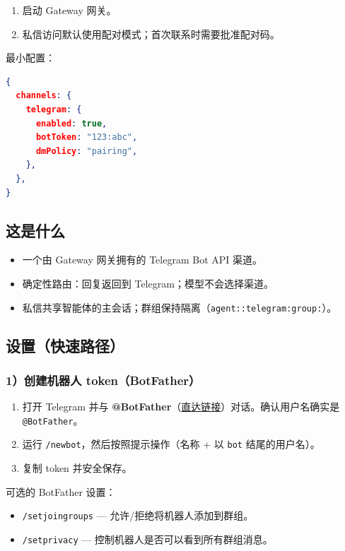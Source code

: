 \begin{enumerate}
  \item 启动 Gateway 网关。
  \item 私信访问默认使用配对模式；首次联系时需要批准配对码。
\end{enumerate}


最小配置：

\begin{lstlisting}[language=json]
{
  channels: {
    telegram: {
      enabled: true,
      botToken: "123:abc",
      dmPolicy: "pairing",
    },
  },
}
\end{lstlisting}


\subsection{这是什么}


\begin{itemize}
  \item 一个由 Gateway 网关拥有的 Telegram Bot API 渠道。
  \item 确定性路由：回复返回到 Telegram；模型不会选择渠道。
  \item 私信共享智能体的主会话；群组保持隔离（\texttt{agent::telegram:group:}）。
\end{itemize}


\subsection{设置（快速路径）}


\subsubsection{1）创建机器人 token（BotFather）}


\begin{enumerate}
  \item 打开 Telegram 并与 \textbf{@BotFather}（\href{https://t.me/BotFather}{直达链接}）对话。确认用户名确实是 \texttt{@BotFather}。
  \item 运行 \texttt{/newbot}，然后按照提示操作（名称 + 以 \texttt{bot} 结尾的用户名）。
  \item 复制 token 并安全保存。
\end{enumerate}


可选的 BotFather 设置：

\begin{itemize}
  \item \texttt{/setjoingroups} — 允许/拒绝将机器人添加到群组。
  \item \texttt{/setprivacy} — 控制机器人是否可以看到所有群组消息。
\end{itemize}


